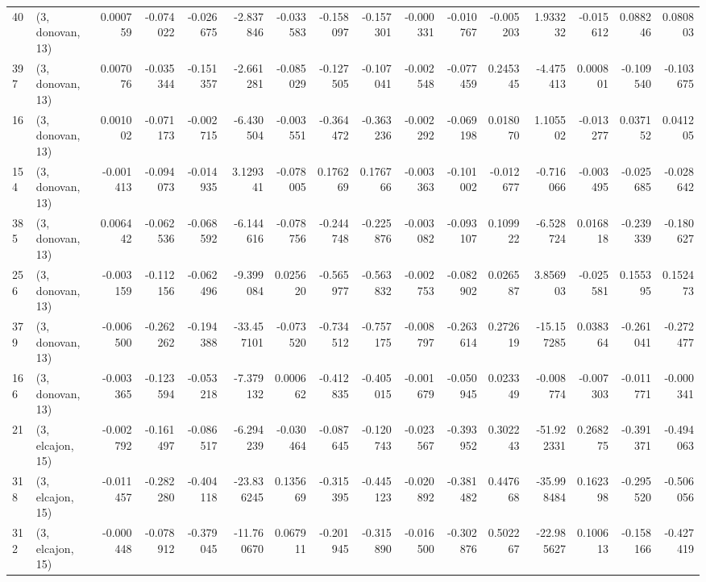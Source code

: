 \begin{tabular}{llrrrrrrrrrrrrrr}
40  &  (3, donovan, 13) &   0.000759 & -0.074022 & -0.026675 &   -2.837846 & -0.033583 &  -0.158097 & -0.157301 & -0.000331 & -0.010767 & -0.005203 &     1.933232 & -0.015612 &  0.088246 &  0.080803 \\
397 &  (3, donovan, 13) &   0.007076 & -0.035344 & -0.151357 &   -2.661281 & -0.085029 &  -0.127505 & -0.107041 & -0.002548 & -0.077459 &  0.245345 &    -4.475413 &  0.000801 & -0.109540 & -0.103675 \\
16  &  (3, donovan, 13) &   0.001002 & -0.071173 & -0.002715 &   -6.430504 & -0.003551 &  -0.364472 & -0.363236 & -0.002292 & -0.069198 &  0.018070 &     1.105502 & -0.013277 &  0.037152 &  0.041205 \\
154 &  (3, donovan, 13) &  -0.001413 & -0.094073 & -0.014935 &    3.129341 & -0.078005 &   0.176269 &  0.176766 & -0.003363 & -0.101002 & -0.012677 &    -0.716066 & -0.003495 & -0.025685 & -0.028642 \\
385 &  (3, donovan, 13) &   0.006442 & -0.062536 & -0.068592 &   -6.144616 & -0.078756 &  -0.244748 & -0.225876 & -0.003082 & -0.093107 &  0.109922 &    -6.528724 &  0.016818 & -0.239339 & -0.180627 \\
256 &  (3, donovan, 13) &  -0.003159 & -0.112156 & -0.062496 &   -9.399084 &  0.025620 &  -0.565977 & -0.563832 & -0.002753 & -0.082902 &  0.026587 &     3.856903 & -0.025581 &  0.155395 &  0.152473 \\
379 &  (3, donovan, 13) &  -0.006500 & -0.262262 & -0.194388 &  -33.457101 & -0.073520 &  -0.734512 & -0.757175 & -0.008797 & -0.263614 &  0.272619 &   -15.157285 &  0.038364 & -0.261041 & -0.272477 \\
166 &  (3, donovan, 13) &  -0.003365 & -0.123594 & -0.053218 &   -7.379132 &  0.000662 &  -0.412835 & -0.405015 & -0.001679 & -0.050945 &  0.023349 &    -0.008774 & -0.007303 & -0.011771 & -0.000341 \\
21  &  (3, elcajon, 15) &  -0.002792 & -0.161497 & -0.086517 &   -6.294239 & -0.030464 &  -0.087645 & -0.120743 & -0.023567 & -0.393952 &  0.302243 &   -51.922331 &  0.268275 & -0.391371 & -0.494063 \\
318 &  (3, elcajon, 15) &  -0.011457 & -0.282280 & -0.404118 &  -23.836245 &  0.135669 &  -0.315395 & -0.445123 & -0.020892 & -0.381482 &  0.447668 &   -35.998484 &  0.162398 & -0.295520 & -0.506056 \\
312 &  (3, elcajon, 15) &  -0.000448 & -0.078912 & -0.379045 &  -11.760670 &  0.067911 &  -0.201945 & -0.315890 & -0.016500 & -0.302876 &  0.502267 &   -22.985627 &  0.100613 & -0.158166 & -0.427419 \\

\end{tabular}
